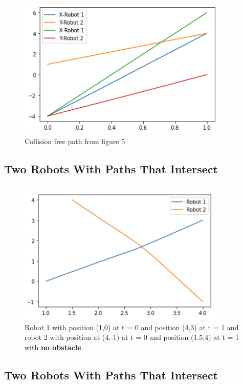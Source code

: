 \begin{figure}[H]
    \centering
    \includegraphics[width=10cm]{Graphs/Collision free path for plot 3.png}
    \caption{Collision free path from figure 5}
    \label{fig:my_label}
\end{figure}



\subsection{Two Robots With Paths That Intersect}


\begin{figure}[H]
    \centering
    \includegraphics[width=10cm]{Graphs/Two Robots Intersecting (1).png}
    \caption{Robot 1 with position (1,0) at t = 0 and position (4,3) at t = 1 and robot 2 with position at (4,-1) at t = 0 and position (1.5,4) at t = 1 with \textbf{no obstacle}.}
    \label{fig:my_label}
\end{figure}


\subsection{Two Robots With Paths That Intersect}


